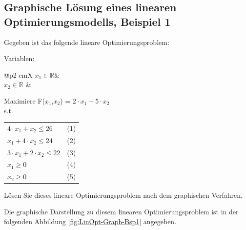 		\subsection{Graphische Lösung eines linearen Optimierungsmodells, Beispiel 1}
				
		Gegeben ist das folgende lineare Optimierungsproblem:

		Variablen:
		\begin{tabularx}{\linewidth}{@{}p{2 cm}X}  %
            $x_1 \in \mathbb{R} $&  \\
            $x_2 \in \mathbb{R} $ &  \\
		\end{tabularx}

		Maximiere F($x_1$,$x_2$) = $ 2 \cdot x_{1} + 5 \cdot x_{2}  $ \\
		s.t.

		\begin{tabularx}{\linewidth}{@{}p{5 cm}X}  %
			$4 \cdot x_{1} + x_2  \le 26 $					& (1) \\
			$x_1 + 4 \cdot x_{2} \le 24 $   				& (2) \\
			$3 \cdot x_{1} + 2 \cdot x_{2} \le 22 $  		& (3) \\
			$x_1 \geq 0$									& (4) \\ 
			$x_2 \geq 0$									& (5) \\
		\end{tabularx}

		Lösen Sie dieses lineare Optimierungsproblem nach dem graphischen Verfahren.\\



		Die graphische Darstellung zu diesem linearen Optimierungsproblem ist in der folgenden Abbildung \ref{fig:LinOpt-Graph-Bsp1} angegeben.

